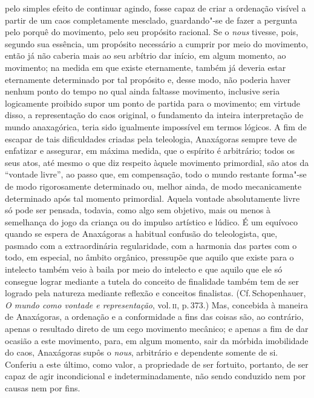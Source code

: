  pelo simples efeito de continuar agindo, fosse capaz de criar a ordenação visível 
 a partir de um caos completamente mesclado, guardando"-se de fazer a pergunta pelo porquê do
 movimento, pelo seu propósito racional. Se o \textit{nous} tivesse, pois,
 segundo sua essência, um propósito necessário a cumprir por meio do
 movimento, então já não caberia mais ao seu arbítrio dar início, em algum
 momento, ao movimento; na medida em que existe eternamente, também já
 deveria estar eternamente determinado por tal propósito e, desse modo, não
 poderia haver nenhum ponto do tempo no qual ainda faltasse movimento,
 inclusive seria logicamente proibido supor um ponto de partida para o
 movimento; em virtude disso, a representação do caos original, o fundamento
 da inteira interpretação de mundo anaxagórica, teria sido igualmente
 impossível em termos lógicos. A fim de escapar de tais dificuldades criadas
 pela teleologia, Anaxágoras sempre teve de enfatizar e assegurar, em máxima
 medida, que o espírito é arbitrário; todos os seus atos, até mesmo o que diz
 respeito àquele movimento primordial, são atos da ``vontade livre'', ao
 passo que, em compensação, todo o mundo restante forma"-se de modo
 rigorosamente determinado ou, melhor ainda, de modo mecanicamente
 determinado após tal momento primordial. Aquela vontade absolutamente livre
 só pode ser pensada, todavia, como algo sem objetivo, mais ou menos à
 semelhança do jogo da criança ou do impulso artístico e lúdico. É um
 equívoco quando se espera de Anaxágoras a habitual confusão do teleologista,
 que, pasmado com a extraordinária regularidade, com a harmonia das partes
 com o todo, em especial, no âmbito orgânico, pressupõe que aquilo que existe
 para o intelecto também veio à baila por meio do intelecto e que aquilo que
 ele só consegue lograr mediante a tutela do conceito de finalidade também
 tem de ser logrado pela natureza mediante reflexão e conceitos finalistas.
 (Cf.\,Schopenhauer, \textit{O mundo como vontade e representação}, vol.\,\textsc{ii}, 
 p.\,373.) Mas, concebida à maneira de Anaxágoras, a ordenação e a conformidade a fins das
 coisas são, ao contrário, apenas o resultado direto de um cego movimento
 mecânico; e apenas a fim de dar ocasião a este movimento, para, em algum
 momento, sair da mórbida imobilidade do caos, Anaxágoras supôs o \textit{nous}, 
 arbitrário e dependente somente de si. Conferiu a este último, como
 valor, a propriedade de ser fortuito, portanto, de ser capaz de agir
 incondicional e indeterminadamente, não sendo conduzido nem por causas nem
 por fins.



